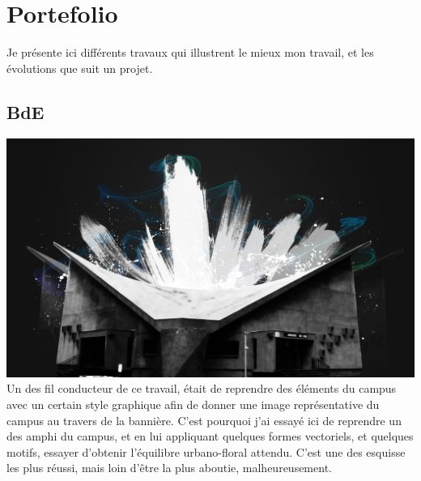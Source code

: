 \newpage

\section{Portefolio}

    Je présente ici différents travaux qui illustrent le mieux mon travail, et les évolutions que suit un projet.
    \subsection{BdE}
        \begin{center}
            \includegraphics[width=\textwidth]{img/amphi.jpg}\\
            Un des fil conducteur de ce travail, était de reprendre des éléments du campus avec un certain style graphique afin de donner une image représentative du campus au travers de la bannière.
	        C'est pourquoi j'ai essayé ici de reprendre un des amphi du campus, et en lui appliquant quelques formes vectoriels, et quelques motifs, essayer d'obtenir l'équilibre urbano-floral attendu.
            C'est une des esquisse les plus réussi, mais loin d'être la plus aboutie, malheureusement.
        \end{center}

